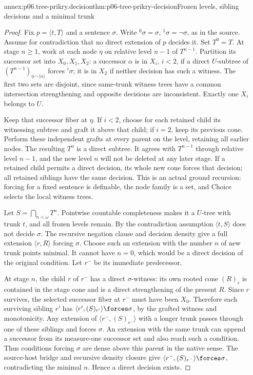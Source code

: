 \begin{annexitem}{annex:p06.tree-prikry.decision}{thm:p06-tree-prikry-decision}{Frozen levels, sibling decisions and a minimal trunk}
\begin{proof}
Fix \(p=\langle t,T\rangle\) and a sentence \(\sigma\). Write
\({}^{0}\sigma=\sigma\), \({}^{1}\sigma=\neg\sigma\), as in the source.
Assume for contradiction that no direct extension of \(p\) decides it.
Set \(T^0=T\). At stage \(n\geq1\), work at each node \(\eta\)
on relative level \(n-1\) of \(T^{n-1}\). Partition its successor set
into \(X_0,X_1,X_2\): a successor \(\alpha\) is in \(X_i\),
\(i<2\), if a direct \(U\)-subtree of
\((T^{n-1})_{\eta\mathbin{\frown}\langle\alpha\rangle}\)
forces \({}^{i}\sigma\); it is in \(X_2\) if neither decision has such
a witness. The first two sets are disjoint, since same-trunk witness
trees have a common intersection strengthening and opposite decisions
are inconsistent. Exactly one \(X_i\) belongs to \(U\).

Keep that successor fiber at \(\eta\). If \(i<2\), choose for each
retained child its witnessing subtree and graft it above that child;
if \(i=2\), keep its previous cone. Perform these independent grafts
at every parent on the level, retaining all earlier nodes. The resulting
\(T^n\) is a direct subtree. It agrees with \(T^{n-1}\) through
relative level \(n-1\), and the new level \(n\) will not be deleted
at any later stage. If a retained child permits a direct decision, its
whole new cone forces that decision; all retained siblings have the
same decision. This is an actual ground recursion: forcing for a fixed
sentence is definable, the node family is a set, and Choice selects the
local witness trees.

Let \(S=\bigcap_{n<\omega}T^n\). Pointwise countable completeness
makes it a \(U\)-tree with trunk \(t\), and all frozen levels remain.
By the contradiction assumption \(\langle t,S\rangle\) does not
decide \(\sigma\). The recursive negation clause and decision density
give a full extension \(\langle r,R\rangle\) forcing \(\sigma\).
Choose such an extension with the number \(n\) of new trunk points
minimal. It cannot have \(n=0\), which would be a direct decision of
the original condition. Let \(r^-\) be its immediate predecessor.

At stage \(n\), the child \(r\) of \(r^-\) has a direct
\(\sigma\)-witness: its own rooted cone \((R)_r\) is contained in
the stage cone and is a direct strengthening of the present \(R\).
Since \(r\) survives, the selected successor fiber at \(r^-\)
must have been \(X_0\). Therefore each surviving sibling \(r'\)
has \(\langle r',(S)_{r'}\rangle\forces\sigma\), by the grafted
witness and monotonicity. Any extension of
\(\langle r^-,(S)_{r^-}\rangle\) with a longer trunk passes through
one of these siblings and forces \(\sigma\). An extension with the
same trunk can append a successor from its measure-one successor set
and also reach such a condition. Thus conditions forcing \(\sigma\)
are dense above this parent in the native sense. The source-host
bridge and recursive density closure give
\(\langle r^-,(S)_{r^-}\rangle\forces\sigma\), contradicting the
minimal \(n\). Hence a direct decision exists.


\end{proof}
\end{annexitem}
